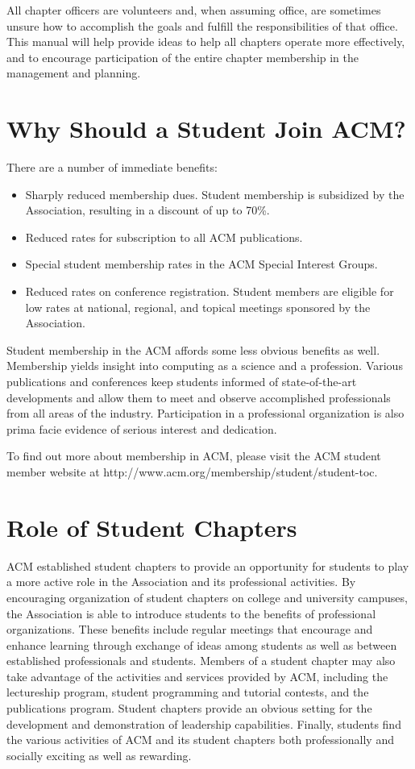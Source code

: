 All chapter officers are volunteers and, when assuming office, are sometimes
unsure how to accomplish the goals and fulfill the responsibilities of that
office. This manual will help provide ideas to help all chapters operate more
effectively, and to encourage participation of the entire chapter membership in
the management and planning.

\section{Why Should a Student Join ACM?}
\label{sec:sec03}

There are a number of immediate benefits:
\begin{itemize}
	\item Sharply reduced membership dues. Student membership is subsidized by
				the Association, resulting in a discount of up to 70\%.
  \item Reduced rates for subscription to all ACM publications.
	\item Special student membership rates in the ACM Special Interest Groups.
	\item Reduced rates on conference registration. Student members are eligible
				for low rates at national, regional, and topical meetings sponsored by
				the Association.
\end{itemize}

Student membership in the ACM affords some less obvious benefits as well.
Membership yields insight into computing as a science and a profession. Various
publications and conferences keep students informed of state-of-the-art
developments and allow them to meet and observe accomplished professionals from
all areas of the industry. Participation in a professional organization is also
prima facie evidence of serious interest and dedication.

To find out more about membership in ACM, please visit the ACM student member
website at http://www.acm.org/membership/student/student-toc.

\section{Role of Student Chapters}
\label{sec:sec04}

ACM established student chapters to provide an opportunity for students to play
a more active role in the Association and its professional activities. By
encouraging organization of student chapters on college and university campuses,
the Association is able to introduce students to the benefits of professional
organizations. These benefits include regular meetings that encourage and
enhance learning through exchange of ideas among students as well as between
established professionals and students. Members of a student chapter may also
take advantage of the activities and services provided by ACM, including the
lectureship program, student programming and tutorial contests, and the
publications program. Student chapters provide an obvious setting for the
development and demonstration of leadership capabilities. Finally, students find
the various activities of ACM and its student chapters both professionally and
socially exciting as well as rewarding.

